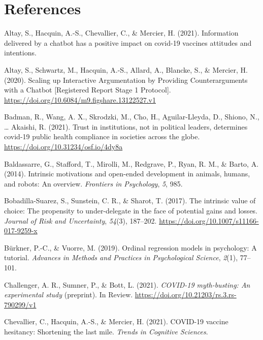 \documentclass[english,,jou,floatsintext]{apa6}
\begin{document}
\hypertarget{references}{%
\section*{References}\label{references}}

\hypertarget{refs}{}
\leavevmode\hypertarget{ref-altay2021information}{}%
Altay, S., Hacquin, A.-S., Chevallier, C., \& Mercier, H. (2021). Information delivered by a chatbot has a positive impact on covid-19 vaccines attitudes and intentions.

\leavevmode\hypertarget{ref-altay_scaling_2020}{}%
Altay, S., Schwartz, M., Hacquin, A.-S., Allard, A., Blancke, S., \& Mercier, H. (2020). Scaling up Interactive Argumentation by Providing Counterarguments with a Chatbot {[}Registered Report Stage 1 Protocol{]}. \url{https://doi.org/10.6084/m9.figshare.13122527.v1}

\leavevmode\hypertarget{ref-badman2021}{}%
Badman, R., Wang, A. X., Skrodzki, M., Cho, H., Aguilar-Lleyda, D., Shiono, N., \ldots{} Akaishi, R. (2021). Trust in institutions, not in political leaders, determines covid-19 public health compliance in societies across the globe. \url{https://doi.org/10.31234/osf.io/4dy8a}

\leavevmode\hypertarget{ref-baldassarre2014intrinsic}{}%
Baldassarre, G., Stafford, T., Mirolli, M., Redgrave, P., Ryan, R. M., \& Barto, A. (2014). Intrinsic motivations and open-ended development in animals, humans, and robots: An overview. \emph{Frontiers in Psychology}, \emph{5}, 985.

\leavevmode\hypertarget{ref-bobadilla-suarez_intrinsic_2017}{}%
Bobadilla-Suarez, S., Sunstein, C. R., \& Sharot, T. (2017). The intrinsic value of choice: The propensity to under-delegate in the face of potential gains and losses. \emph{Journal of Risk and Uncertainty}, \emph{54}(3), 187--202. \url{https://doi.org/10.1007/s11166-017-9259-x}

\leavevmode\hypertarget{ref-burkner2019ordinal}{}%
Bürkner, P.-C., \& Vuorre, M. (2019). Ordinal regression models in psychology: A tutorial. \emph{Advances in Methods and Practices in Psychological Science}, \emph{2}(1), 77--101.

\leavevmode\hypertarget{ref-challenger_covid-19_2021}{}%
Challenger, A. R., Sumner, P., \& Bott, L. (2021). \emph{COVID-19 myth-busting: An experimental study} (preprint). In Review. \url{https://doi.org/10.21203/rs.3.rs-790299/v1}

\leavevmode\hypertarget{ref-chevallier2021covid}{}%
Chevallier, C., Hacquin, A.-S., \& Mercier, H. (2021). COVID-19 vaccine hesitancy: Shortening the last mile. \emph{Trends in Cognitive Sciences}.
\end{document}
